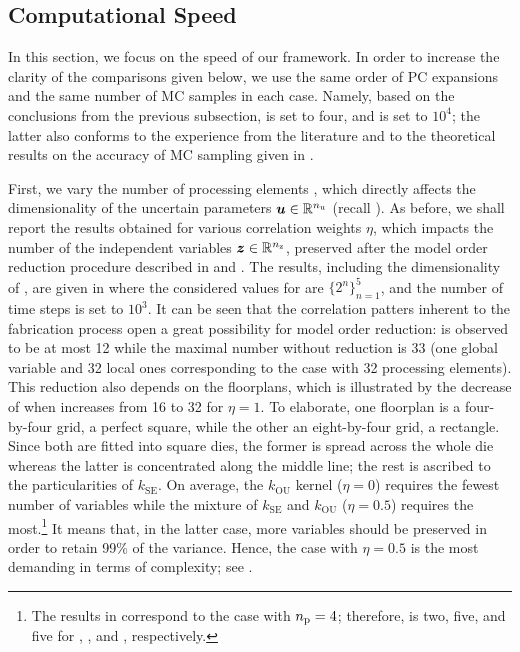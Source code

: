 \subsection{Computational Speed}

In this section, we focus on the speed of our framework. In order to increase
the clarity of the comparisons given below, we use the same order of PC
expansions and the same number of MC samples in each case. Namely, based on the
conclusions from the previous subsection, \lc is set to four, and \ns is set to
$10^4$; the latter also conforms to the experience from the literature
\cite{huang2009, lee2013, shen2009, bhardwaj2008, ghanta2006} and to the
theoretical results on the accuracy of MC sampling given in
\cite{diaz-emparanza2002}.

First, we vary the number of processing elements \np, which directly affects the
dimensionality of the uncertain parameters $\boldsymbol{u} \in \mathbb{R}^{n_\mathrm{u}}$ (recall
). As before, we shall report the results obtained
for various correlation weights $\eta$, which impacts the number of the
independent variables $\boldsymbol{z} \in \mathbb{R}^{n_\mathrm{z}}$, preserved after the model order
reduction procedure described in  and
. The results, including the dimensionality \nz of \vz, are
given in  where the considered values for \np
are $\{ 2^n \}_{n = 1}^5$, and the number of time steps \ns is set to $10^3$. It
can be seen that the correlation patters inherent to the fabrication process
\cite{cheng2011} open a great possibility for model order reduction: \nz is
observed to be at most 12 while the maximal number without reduction is 33 (one
global variable and 32 local ones corresponding to the case with 32 processing
elements). This reduction also depends on the floorplans, which is illustrated
by the decrease of \nz when \np increases from 16 to 32 for $\eta = 1$. To
elaborate, one floorplan is a four-by-four grid, a perfect square, while the
other an eight-by-four grid, a rectangle. Since both are fitted into square
dies, the former is spread across the whole die whereas the latter is
concentrated along the middle line; the rest is ascribed to the particularities
of $k_\mathrm{SE}$. On average, the $k_\mathrm{OU}$ kernel ($\eta = 0$) requires
the fewest number of variables while the mixture of $k_\mathrm{SE}$ and
$k_\mathrm{OU}$ ($\eta = 0.5$) requires the most.\footnote{The results in
 correspond to the case with ${n_\mathrm{p}} = 4$; therefore, \nz is two,
five, and five for , , and
, respectively.} It means that, in the latter case, more
variables should be preserved in order to retain 99\% of the variance. Hence,
the case with $\eta = 0.5$ is the most demanding in terms of complexity; see
.

